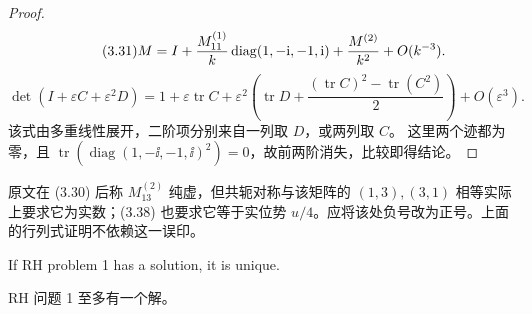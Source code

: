 \begin{proof}
\begin{equation}\originaleq{3.31}
M=I+\dfrac{M_{11}^{(1)}}{k}\operatorname{diag}(1,-\ii,-1,\ii)+\dfrac{M^{(2)}}{k^2}+O(k^{-3}).
\end{equation}
\[
\det(I+\varepsilon C+\varepsilon^2D)
=1+\varepsilon\operatorname{tr}C+\varepsilon^2\left(\operatorname{tr}D+\dfrac{(\operatorname{tr}C)^2-\operatorname{tr}(C^2)}{2}\right)+O(\varepsilon^3).
\]
该式由多重线性展开，二阶项分别来自一列取 $D$，或两列取 $C$。
这里两个迹都为零，且 $\operatorname{tr}(\operatorname{diag}(1,-\ii,-1,\ii)^2)=0$，故前两阶消失，比较即得结论。
\end{proof}
\begin{note}
原文在 (3.30) 后称 $M_{13}^{(2)}$ 纯虚，但共轭对称与该矩阵的 $(1,3),(3,1)$ 相等实际上要求它为实数；(3.38) 也要求它等于实位势 $u/4$。应将该处负号改为正号。上面的行列式证明不依赖这一误印。
\end{note}
\begin{paperlemmaen}
If RH problem 1 has a solution, it is unique.
\end{paperlemmaen}
\begin{paperlemmacn*}
RH 问题 1 至多有一个解。
\end{paperlemmacn*}
